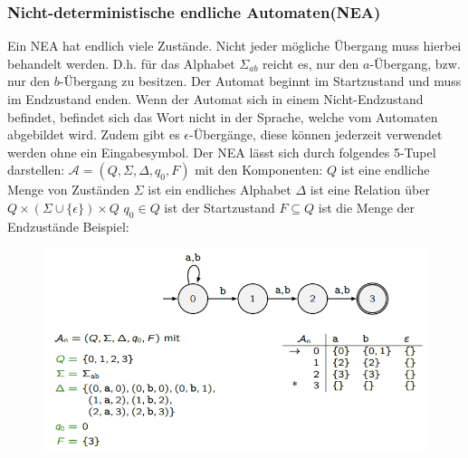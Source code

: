 \documentclass[12pt,a4paper]{article}
\begin{document}
\subsubsection{Nicht-deterministische endliche Automaten(NEA)}
Ein NEA hat endlich viele Zustände. Nicht jeder mögliche Übergang muss hierbei behandelt werden. D.h. für das Alphabet $\varSigma_{ab}$ reicht es, nur den $a$-Übergang, bzw. nur den $b$-Übergang zu besitzen. Der Automat beginnt im Startzustand und muss im Endzustand enden. Wenn der Automat sich in einem Nicht-Endzustand befindet, befindet sich das Wort nicht in der Sprache, welche vom Automaten abgebildet wird. Zudem gibt es $\epsilon$-Übergänge, diese können jederzeit verwendet werden ohne ein Eingabesymbol.\newline
\noindent Der NEA lässt sich durch folgendes 5-Tupel darstellen:\newline
$\mathcal{A} = (Q, \varSigma, \Delta , q_0, F)$ mit den Komponenten:\newline
$Q$ ist eine endliche Menge von Zuständen\newline
$\varSigma$ ist ein endliches Alphabet\newline
$\Delta$ ist eine Relation über $Q \times (\varSigma \cup \{\epsilon\}) \times Q$\newline
$q_0 \in Q$ ist der Startzustand\newline
$F \subseteq Q$ ist die Menge der Endzustände\newline
\newline
Beispiel:\newline
\begin{center}
	\begin{figure}[!h]
		\includegraphics[width=\textwidth]{Bilder/NEA_Beispiel.png}
	\end{figure}
\end{center}
\end{document}
